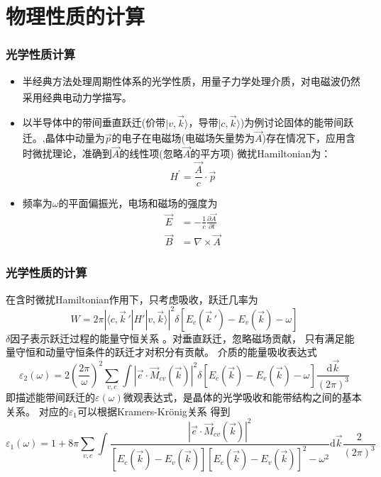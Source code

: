 \documentclass[cjk,slidestop,compress,mathserif,blue]{beamer}
\newcommand{\upcite}[1]{\hspace{0ex}\textsuperscript{\cite{#1}}} %
\begin{document}
\section{物理性质的计算}
\frame
{
\frametitle{光学性质计算}
\begin{itemize}
\setlength{\itemsep}{10pt}
	\item 半经典方法处理周期性体系的光学性质，用量子力学处理介质，对电磁波仍然采用经典电动力学描写。\upcite{Huang_Han}
	\item 以半导体中的带间垂直跃迁(价带$|v,\vec k\rangle$，导带$|c,\vec k\rangle$)为例讨论固体的能带间跃迁。,晶体中动量为$\vec p$的电子在电磁场(电磁场矢量势为$\vec A$)存在情况下，应用含时微扰理论，准确到$\vec A$的线性项(忽略$\vec A$的平方项)
微扰\textrm{Hamiltonian}为：
\begin{displaymath}
  H^{\prime}=\dfrac{\vec A}c\cdot\vec p
  \label{eq:optic-25}
\end{displaymath}
	\item 频率为$\omega$的平面偏振光，电场和磁场的强度为
\begin{displaymath}
\begin{aligned}
    \vec E&=-\frac1c\frac{\partial\vec A}{\partial t}\\
    \vec B&=\nabla\times\vec A
  \end{aligned}%
  \label{eq:optic-26}
\end{displaymath}
\end{itemize}
}
\frame
{
\frametitle{光学性质的计算}
在含时微扰\textrm{Hamiltonian}作用下，只考虑吸收，跃迁几率为
\begin{displaymath}
  W=2\pi|\langle c,\vec k\,'|H'|v,\vec k\rangle|^2\delta[E_c(\vec k\,')-E_v(\vec k)-\omega]
  \label{eq:optic-27}
\end{displaymath}
$\delta$因子表示跃迁过程的能量守恒关系%
。对垂直跃迁，忽略磁场贡献，%
只有满足能量守恒和动量守恒条件的跃迁才对积分有贡献。%
介质的能量吸收表达式
\begin{displaymath}
  \varepsilon_2(\omega)=2\left(\frac{2\pi}{\omega}\right)^2\sum_{v,c}\int|\vec e\cdot\vec M_{cv}(\vec k)|^2\delta[E_c(\vec k)-E_v(\vec k)-\omega]\frac{\textrm{d}\vec k}{(2\pi)^3}
  \label{eq:optic-32}
\end{displaymath}
即描述能带间跃迁的$\varepsilon(\omega)$微观表达式，是晶体的光学吸收和能带结构之间的基本关系。
对应的$\varepsilon_1$可以根据\textrm{Kramers-Kr\"onig}关系%
得到
\footnotesize{\begin{displaymath}
  \varepsilon_1(\omega)=1+8\pi\sum_{v,c}\int\frac{|\vec e\cdot\vec M_{cv}(\vec k)|^2}{[E_c(\vec k)-E_v(\vec k)][E_c(\vec k)-E_v(\vec k)]^2-\omega^2}\textrm{d}\vec k\frac2{(2\pi)^3}
  \label{eq:optic-35}
\end{displaymath}}
}
\end{document}
